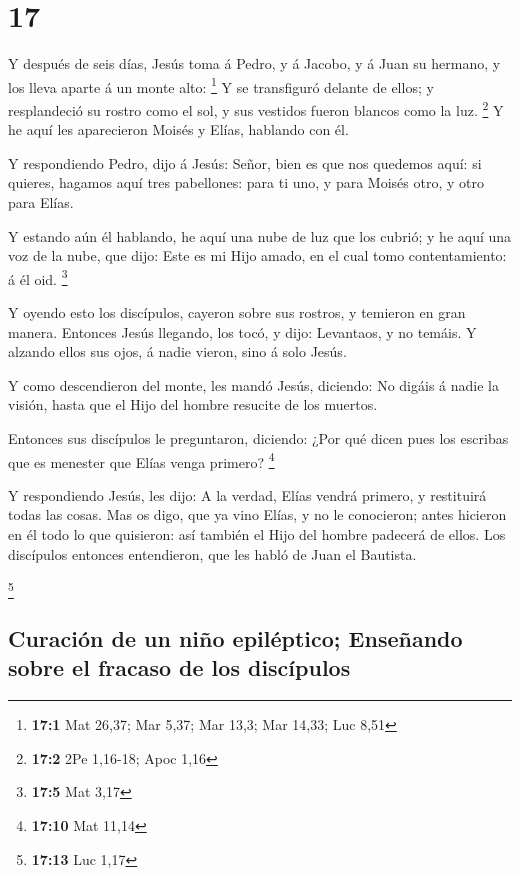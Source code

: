 \hypertarget{section-16}{%
\section{17}\label{section-16}}

 Y después de seis días, Jesús toma á Pedro, y á Jacobo, y
á Juan su hermano, y los lleva aparte á un monte alto: \footnote{\textbf{17:1}
  Mat 26,37; Mar 5,37; Mar 13,3; Mar 14,33; Luc 8,51}  Y
se transfiguró delante de ellos; y resplandeció su rostro como el sol, y
sus vestidos fueron blancos como la luz. \footnote{\textbf{17:2} 2Pe
  1,16-18; Apoc 1,16}  Y he aquí les aparecieron Moisés y
Elías, hablando con él.

 Y respondiendo Pedro, dijo á Jesús: Señor, bien es que
nos quedemos aquí: si quieres, hagamos aquí tres pabellones: para ti
uno, y para Moisés otro, y otro para Elías.

 Y estando aún él hablando, he aquí una nube de luz que
los cubrió; y he aquí una voz de la nube, que dijo: Este es mi Hijo
amado, en el cual tomo contentamiento: á él oid. \footnote{\textbf{17:5}
  Mat 3,17}

 Y oyendo esto los discípulos, cayeron sobre sus rostros,
y temieron en gran manera.  Entonces Jesús llegando, los
tocó, y dijo: Levantaos, y no temáis.  Y alzando ellos sus
ojos, á nadie vieron, sino á solo Jesús.

 Y como descendieron del monte, les mandó Jesús, diciendo:
No digáis á nadie la visión, hasta que el Hijo del hombre resucite de
los muertos.

 Entonces sus discípulos le preguntaron, diciendo: ¿Por
qué dicen pues los escribas que es menester que Elías venga primero?
\footnote{\textbf{17:10} Mat 11,14}

 Y respondiendo Jesús, les dijo: A la verdad, Elías
vendrá primero, y restituirá todas las cosas.  Mas os
digo, que ya vino Elías, y no le conocieron; antes hicieron en él todo
lo que quisieron: así también el Hijo del hombre padecerá de ellos.
 Los discípulos entonces entendieron, que les habló de
Juan el Bautista.

\footnote{\textbf{17:13} Luc 1,17}

\hypertarget{curaciuxf3n-de-un-niuxf1o-epiluxe9ptico-enseuxf1ando-sobre-el-fracaso-de-los-discuxedpulos}{%
\subsection{Curación de un niño epiléptico; Enseñando sobre el fracaso
de los
discípulos}\label{curaciuxf3n-de-un-niuxf1o-epiluxe9ptico-enseuxf1ando-sobre-el-fracaso-de-los-discuxedpulos}}

